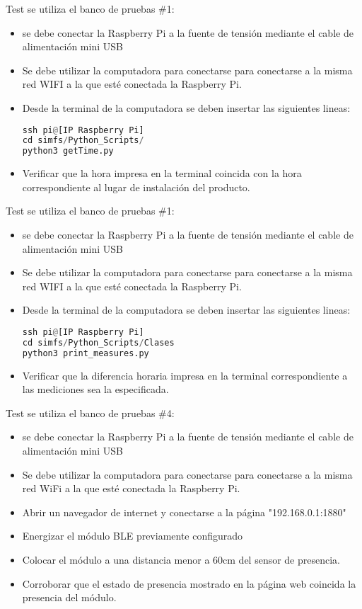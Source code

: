 
Test \TBC se utiliza el banco de pruebas \#1:
\begin{itemize}
\item se debe conectar la Raspberry Pi a la fuente de tensión mediante el cable de alimentación mini USB
\item Se debe utilizar la computadora para conectarse para conectarse a la misma red WIFI a la que esté conectada la Raspberry Pi.
\item Desde la terminal de la computadora se deben insertar las siguientes lineas:
\begin{lstlisting}[language=Python]
ssh pi@[IP Raspberry Pi] 
cd simfs/Python_Scripts/
python3 getTime.py
\end{lstlisting}
\item Verificar que la hora impresa en la terminal coincida con la hora correspondiente al lugar de instalación del producto.
\end{itemize}

Test \TBC se utiliza el banco de pruebas \#1:
\begin{itemize}
\item se debe conectar la Raspberry Pi a la fuente de tensión mediante el cable de alimentación mini USB
\item Se debe utilizar la computadora para conectarse para conectarse a la misma red WIFI a la que esté conectada la Raspberry Pi.
\item Desde la terminal de la computadora se deben insertar las siguientes lineas:
\begin{lstlisting}[language=Python]
ssh pi@[IP Raspberry Pi] 
cd simfs/Python_Scripts/Clases
python3 print_measures.py
\end{lstlisting}
\item Verificar que la diferencia horaria impresa en la terminal correspondiente a las mediciones sea la especificada.
\end{itemize}



Test \TBC se utiliza el banco de pruebas \#4:
\begin{itemize}
\item se debe conectar la Raspberry Pi a la fuente de tensión mediante el cable de alimentación mini USB
\item Se debe utilizar la computadora para conectarse para conectarse a la misma red WiFi a la que esté conectada la Raspberry Pi.
\item Abrir un navegador de internet y conectarse a la página "192.168.0.1:1880"
\item Energizar el módulo BLE previamente configurado
\item Colocar el módulo a una distancia menor a 60cm del sensor de presencia.
\item Corroborar que el estado de presencia mostrado en la página web coincida la presencia del módulo.
\end{itemize}

